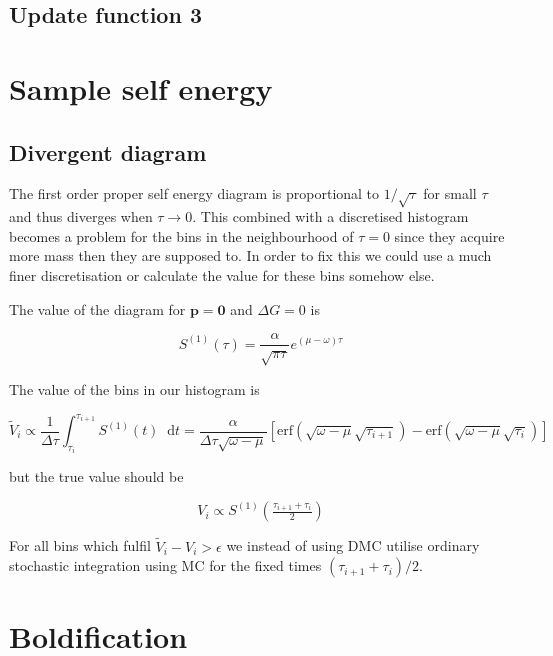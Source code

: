 \documentclass[12pt]{report}
\renewcommand{\vec}[1]{\boldsymbol{\mathbf{#1}}}                        %
\newcommand*\diff{\mathop{}\!\mathrm{d}}
\begin{document}
\subsection{Update function 3}

\section{Sample self energy}

\subsection{Divergent diagram}

The first order proper self energy diagram is proportional to $ 1/\sqrt{\tau} $ for small $ \tau $ and thus diverges when $ \tau \rightarrow 0 $. This combined with a discretised histogram becomes a problem for the bins in the neighbourhood of $ \tau = 0 $ since they acquire more mass then they are supposed to. In order to fix this we could use a much finer discretisation or calculate the value for these bins somehow else.

The value of the diagram for $ \vec p = \vec 0 $ and $ \Delta G = 0 $ is

\begin{equation}
	S^{(1)}(\tau) = \frac{\alpha}{\sqrt{\pi \tau}} e^{(\mu - \omega)\tau}
\end{equation}

The value of the bins in our histogram is

\begin{equation}
	\tilde V_i \propto \frac{1}{\Delta \tau} \int_{\tau_i}^{\tau_{i + 1}} S^{(1)} (t) \diff t
	= \frac{\alpha}{\Delta \tau \sqrt{\omega - \mu}} \left[ \text{erf}\left(\sqrt{\omega - \mu} \sqrt{\tau_{i+1}}\right) - \text{erf}\left(\sqrt{\omega - \mu} \sqrt{\tau_i}\right) \right]
\end{equation}

 but the true value should be
 
\begin{equation}
	V_i \propto S^{(1)} \left( \tfrac{\tau_{i+1} + \tau_i}{2} \right)	
\end{equation}

For all bins which fulfil $ \tilde V_i  - V_i > \epsilon $ we instead of using DMC utilise ordinary stochastic integration using MC for the fixed times $ (\tau_{i+1} + \tau_i)/2 $.

\section{Boldification}
\end{document}
